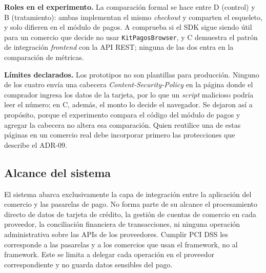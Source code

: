 \textbf{Roles en el experimento.} La comparación formal se hace entre D (control) y B (tratamiento): ambas implementan el mismo \textit{checkout} y comparten el esqueleto, y solo difieren en el módulo de pagos. A comprueba si el SDK sigue siendo útil para un comercio que decide no usar \texttt{KitPagosBrowser}, y C demuestra el patrón de integración \textit{frontend} con la API REST; ninguna de las dos entra en la comparación de métricas.

\textbf{Límites declarados.} Los prototipos no son plantillas para producción. Ninguno de los cuatro envía una cabecera \textit{Content-Security-Policy} en la página donde el comprador ingresa los datos de la tarjeta, por lo que un \textit{script} malicioso podría leer el número; en C, además, el monto lo decide el navegador. Se dejaron así a propósito, porque el experimento compara el código del módulo de pagos y agregar la cabecera no altera esa comparación. Quien reutilice una de estas páginas en un comercio real debe incorporar primero las protecciones que describe el ADR-09.

\subsection{Alcance del sistema}
El sistema abarca exclusivamente la capa de integración entre la aplicación del comercio y las pasarelas de pago. No forma parte de su alcance el procesamiento directo de datos de tarjeta de crédito, la gestión de cuentas de comercio en cada proveedor, la conciliación financiera de transacciones, ni ninguna operación administrativa sobre las APIs de los proveedores. Cumplir PCI DSS les corresponde a las pasarelas y a los comercios que usan el framework, no al framework. Este se limita a delegar cada operación en el proveedor correspondiente y no guarda datos sensibles del pago.

